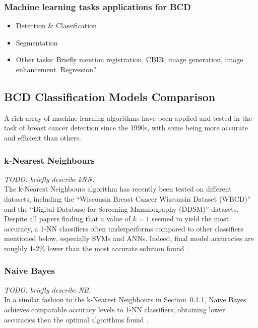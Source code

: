 \subsubsection{Machine learning tasks applications for BCD}

\begin{itemize}
    \item Detection \& Classification
    \item Segmentation
    \item Other tasks: Briefly mention registration, CBIR, image generation, image enhancement. Regression?
\end{itemize}

\subsection{BCD Classification Models Comparison}

A rich array of machine learning algorithms have been applied and tested in the task of breast cancer detection since the 1990s, with some being more accurate and efficient than others.

\subsubsection{k-Nearest Neighbours}
\label{sec:litreview-knn}

\textit{TODO: briefly describe kNN.}\\

The k-Nearest Neighbours algorithm has recently been tested on different datasets, including the ``Wisconsin Breast Cancer Wisconsin Dataset (WBCD)'' \cite{Wolberg1995} and the ``Digital Database for Screening Mammography (DDSM)'' \cite{DDSMdataset2001} datasets. Despite all papers finding that a value of $k=1$ seemed to yield the most accuracy, a 1-NN classifiers often underperforms compared to other classifiers mentioned below, especially SVMs and ANNs. Indeed, final model accuracies are roughly 1-2\% lower than the most accurate solution found \cite{Yue2018} \cite{Asri2016} \cite{Montazeri2016}.

\subsubsection{Naive Bayes}

\textit{TODO: briefly describe NB.}\\

In a similar fashion to the k-Nearest Neighbours in Section~\ref{sec:litreview-knn}, Naive Bayes achieves comparable accuracy levels to 1-NN classifiers, obtaining lower accuracies then the optimal algorithms found \cite{Yue2018} \cite{Montazeri2016}.

